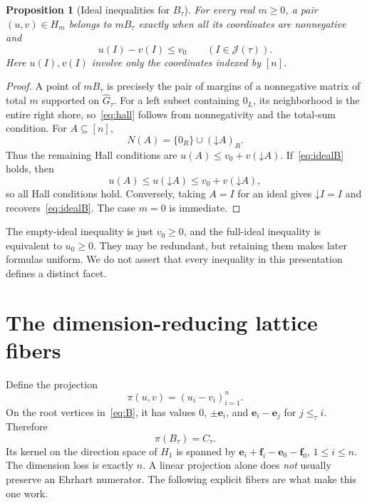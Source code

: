 \documentclass[11pt]{article}
\numberwithin{equation}{section}
\newtheorem{proposition}[theorem]{Proposition}
\theoremstyle{definition}
\newcommand{\J}{\mathcal J(\tau)}
\newcommand{\ee}{\mathbf e}
\newcommand{\ff}{\mathbf f}
\newcommand{\down}{\mathord\downarrow}
\begin{document}
\begin{proposition}[Ideal inequalities for $B_\tau$]\label{prop:inequalities}
For every real $m\geq0$, a pair $(u,v)\in H_m$ belongs to $mB_\tau$ exactly
when all its coordinates are nonnegative and
\begin{equation}
 u(I)-v(I)\leq v_0\qquad(I\in\J).\label{eq:idealB}
\end{equation}
Here $u(I),v(I)$ involve only the coordinates indexed by $[n]$.
\end{proposition}
\begin{proof}
A point of $mB_\tau$ is precisely the pair of margins of a nonnegative matrix
of total $m$ supported on $\widehat G_\tau$. For a left subset containing
$0_L$, its neighborhood is the entire right shore, so~\eqref{eq:hall} follows
from nonnegativity and the total-sum condition. For $A\subseteq[n]$,
\[
 N(A)=\{0_R\}\cup(\down A)_R.
\]
Thus the remaining Hall conditions are
$u(A)\leq v_0+v(\down A)$. If~\eqref{eq:idealB} holds, then
\[
 u(A)\leq u(\down A)\leq v_0+v(\down A),
\]
so all Hall conditions hold. Conversely, taking $A=I$ for an ideal gives
$\down I=I$ and recovers~\eqref{eq:idealB}. The case $m=0$ is immediate.
\end{proof}

The empty-ideal inequality is just $v_0\geq0$, and the full-ideal inequality
is equivalent to $u_0\geq0$. They may be redundant, but retaining them makes
later formulas uniform. We do not assert that every inequality in this
presentation defines a distinct facet.

\section{The dimension-reducing lattice fibers}\label{sec:fibers}

Define the projection
\begin{equation}
 \pi(u,v)=(u_i-v_i)_{i=1}^{n}.\label{eq:projection}
\end{equation}
On the root vertices in~\eqref{eq:B}, it has values
$0$, $\pm\ee_i$, and $\ee_i-\ee_j$ for $j\leq_\tau i$. Therefore
\begin{equation}
 \pi(B_\tau)=C_\tau.\label{eq:projectC}
\end{equation}
Its kernel on the direction space of $H_1$ is spanned by
$\ee_i+\ff_i-\ee_0-\ff_0$, $1\leq i\leq n$. The dimension loss is exactly
$n$. A linear projection alone does \emph{not} usually preserve an Ehrhart
numerator. The following explicit fibers are what make this one work.
\end{document}
